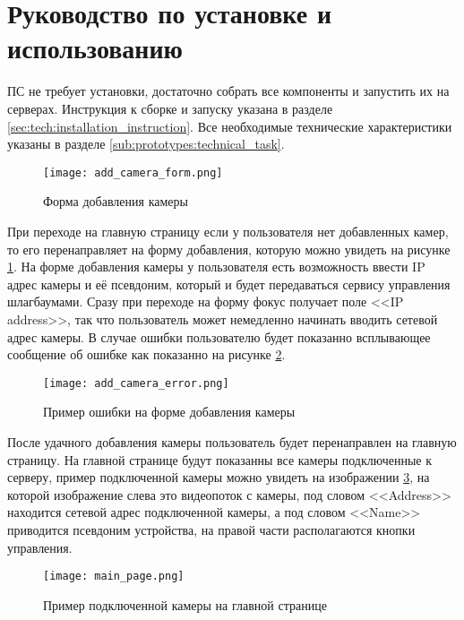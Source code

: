 \section{Руководство по установке и использованию} 
\label{sec:user_guide}

ПС не требует установки, достаточно собрать все компоненты и запустить их на серверах. Инструкция к сборке и запуску указана в разделе \ref{sec:tech:installation_instruction}.
Все необходимые технические характеристики указаны в разделе \ref{sub:prototypes:technical_task}.

\begin{figure}[ht]
  \centering
  \texttt{[image: add\_camera\_form.png]} 
  \caption{Форма добавления камеры} 
  \label{sec:user_guide:add_camera}
\end{figure}

При переходе на главную страницу если у пользователя нет добавленных камер, то его перенаправляет на форму добавления, которую можно увидеть на рисунке \ref{sec:user_guide:add_camera}. На форме добавления камеры у пользователя есть возможность ввести IP адрес камеры и её псевдоним, который и будет передаваться сервису управления шлагбаумами. Сразу при переходе на форму фокус получает поле <<IP address>>, так что пользователь может немедленно начинать вводить сетевой адрес камеры. В случае ошибки пользователю будет показанно всплывающее сообщение об ошибке как показанно на рисунке \ref{sec:user_guide:add_camera_error}.

\begin{figure}[ht]
  \centering
  \texttt{[image: add\_camera\_error.png]} 
  \caption{Пример ошибки на форме добавления камеры} 
  \label{sec:user_guide:add_camera_error}
\end{figure}

После удачного добавления камеры пользователь будет перенаправлен на главную страницу. На главной странице будут показанны все камеры подключенные к серверу, пример подключенной камеры можно увидеть на изображении \ref{sec:user_guide:main_page_camera}, на которой изображение слева это видеопоток с камеры, под словом <<Address>> находится сетевой адрес подключенной камеры, а под словом <<Name>> приводится псевдоним устройства, на правой части располагаются кнопки управления. 

\begin{figure}[ht]
  \centering
  \texttt{[image: main\_page.png]} 
  \caption{Пример подключенной камеры на главной странице} 
  \label{sec:user_guide:main_page_camera}
\end{figure}

